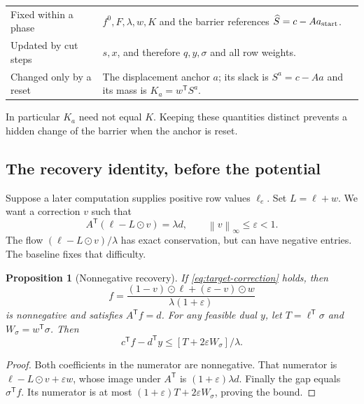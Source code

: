 \documentclass[11pt]{article}
\newtheorem{proposition}[theorem]{Proposition}
\theoremstyle{definition}\newtheorem{definition}[theorem]{Definition}
\theoremstyle{remark}\newtheorem{remark}[theorem]{Remark}
\newcommand{\norm}[1]{\left\lVert#1\right\rVert}
\begin{document}
\begin{center}
\begin{tabular}{p{.27\linewidth}p{.64\linewidth}}
\toprule
Fixed within a phase & $f^0,F,\lambda,w,K$ and the barrier references
$\widehat S=c-Aa_{\rm start}$.\\
Updated by cut steps & $s,x$, and therefore $q,y,\sigma$ and all row weights.\\
Changed only by a reset & The displacement anchor $a$; its slack is
$S^a=c-Aa$ and its mass is $K_a=w^{\mathsf T}S^a$.\\
\bottomrule
\end{tabular}
\end{center}
In particular $K_a$ need not equal $K$. Keeping these quantities distinct
prevents a hidden change of the barrier when the anchor is reset.

\subsection{The recovery identity, before the potential}

Suppose a later computation supplies positive row values $\ell_e$.
Set $L=\ell+w$. We want a correction $v$ such that
\begin{equation}\label{eq:target-correction}
 A^{\mathsf T}(\ell-L\odot v)=\lambda d,
 \qquad \norm v_\infty\le\varepsilon<1.
\end{equation}
The flow $(\ell-L\odot v)/\lambda$ has exact conservation, but can
have negative entries. The baseline fixes that difficulty.

\begin{proposition}[Nonnegative recovery]\label{prop:early-recovery}
If \eqref{eq:target-correction} holds, then
\begin{equation}\label{eq:recovery-flow-formula}
 \boxed{f=\frac{(1-v)\odot\ell+(\varepsilon-v)\odot w}
                         {\lambda(1+\varepsilon)}}
\end{equation}
is nonnegative and satisfies $A^{\mathsf T}f=d$. For any feasible dual
$y$, let $T=\ell^{\mathsf T}\sigma$ and
$W_\sigma=w^{\mathsf T}\sigma$. Then
\begin{equation}\label{eq:recovery-gap-formula}
 c^{\mathsf T}f-d^{\mathsf T}y
 \le [T+2\varepsilon W_\sigma]/\lambda.
\end{equation}
\end{proposition}
\begin{proof}
Both coefficients in the numerator are nonnegative. That numerator is
$\ell-L\odot v+\varepsilon w$, whose image under $A^{\mathsf T}$ is
$(1+\varepsilon)\lambda d$. Finally the gap equals
$\sigma^{\mathsf T}f$. Its numerator is at most
$(1+\varepsilon)T+2\varepsilon W_\sigma$, proving the bound.
\end{proof}
\end{document}
